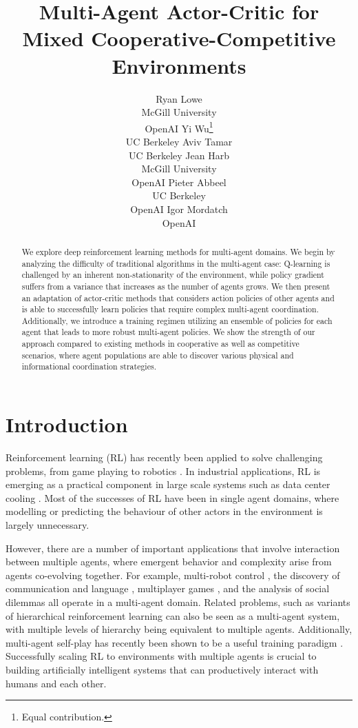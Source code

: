 \documentclass{article}
\title{Multi-Agent Actor-Critic for Mixed Cooperative-Competitive Environments}
\author{Ryan Lowe\\ McGill University\\ OpenAI \And \hspace{-4mm}Yi Wu\thanks{Equal contribution.}\\ \hspace{-4mm}UC Berkeley \And Aviv Tamar\\ UC Berkeley \AND Jean Harb\\McGill University\\ OpenAI \And Pieter Abbeel\\UC Berkeley\\ OpenAI \And Igor Mordatch\\ OpenAI
}
\begin{document}
\maketitle

\begin{abstract}
We explore deep reinforcement learning methods for multi-agent domains. We begin by analyzing the difficulty of traditional algorithms in the multi-agent case: Q-learning is challenged by an inherent non-stationarity of the environment, while policy gradient suffers from a variance that increases as the number of agents grows. 
We then present an adaptation of actor-critic methods that considers action policies of other agents and is able to successfully learn policies that require complex multi-agent coordination. Additionally, we introduce a training regimen utilizing an ensemble of policies for each agent that leads to more robust multi-agent policies. We show the strength of our approach compared to existing methods in cooperative as well as competitive scenarios, where agent populations are able to discover various physical and informational coordination strategies.





\end{abstract}

\section{Introduction}
Reinforcement learning (RL) has recently been applied to solve challenging problems, from game playing \cite{mnih2015human,alphago} to robotics \cite{levine2015end}. In industrial applications, RL is emerging as a practical component in large scale systems such as data center cooling \cite{googleblog}. 
Most of the successes of RL have been in single agent domains, where modelling or predicting the behaviour of other actors in the environment is largely unnecessary.


However, there are a number of important applications that involve interaction between multiple agents, where emergent behavior and complexity arise from agents co-evolving together. For example, multi-robot control \cite{matignon12coordinated}, the discovery of communication and language \cite{sukhbaatar2016learning,foerster16b,mordatch2017emergence}, multiplayer games \cite{peng17starcraft}, and the analysis of social dilemmas \cite{multiagent_ssd} all operate in a multi-agent domain. Related problems, such as variants of hierarchical reinforcement learning \cite{dayan93feudal} can also be seen as a multi-agent system, with multiple levels of hierarchy being equivalent to multiple agents. Additionally, multi-agent self-play has recently been shown to be a useful training paradigm \cite{alphago, sukhbaatar2017intrinsic}. 
Successfully scaling RL to environments with multiple agents is crucial to building artificially intelligent systems that can productively interact with humans and each other.
\end{document}
